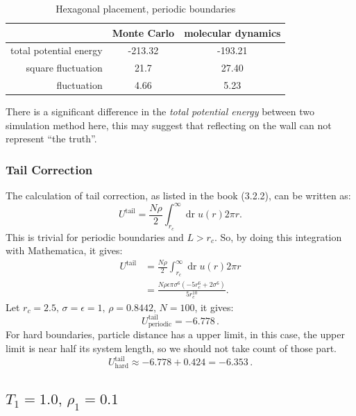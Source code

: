 \documentclass[UTF8,a4paper,no-math]{article}
\begin{document}
\begin{table}[H]
	\centering
	\caption{Hexagonal placement, periodic boundaries}
	\begin{tabular}{rcc}
		\toprule
		\toprule
		                       & Monte Carlo & molecular dynamics \\ \midrule
		total potential energy & -213.32     & -193.21            \\
		square fluctuation     & 21.7        & 27.40              \\
		fluctuation            & 4.66        & 5.23               \\
		\bottomrule
	\end{tabular}%
	\label{tab:hex2}%
\end{table}%
There is a significant difference in the \textit{total potential energy} between two simulation method here, this may suggest that reflecting on the wall can not represent ``the truth''.

\subsubsection{Tail Correction}
The calculation of tail correction, as listed in the book (3.2.2), can be written as:
\begin{equation}
	U^{\text{tail}} = \frac{N \rho}{2} \int_{r_{c}}^{\infty} \operatorname{dr} u(r) 2 \pi r.
\end{equation}
This is trivial for periodic boundaries and $L>r_c$. So, by doing this integration with Mathematica, it gives:
\begin{equation}
	\begin{aligned}
		U^{\text{tail}} &= \frac{N \rho}{2} \int_{r_{c}}^{\infty} \operatorname{dr} u(r) 2 \pi r \\
						&= \frac{N \rho \epsilon \pi \sigma^6\left(-5 r_c^6 + 2 \sigma^6\right)}{5 r_c^{10}}.
	\end{aligned}
\end{equation}
Let $r_c = 2.5, \, \sigma = \epsilon = 1, \,\rho = 0.8442, \,N = 100$, it gives:
\begin{equation*}
	U^{\text{tail}}_{\text{periodic}} = -6.778\,.
\end{equation*}
For hard boundaries, particle distance has a upper limit, in this case, the upper limit is near half its system length, so we should not take count of those part.
\begin{equation*}
	U^{\text{tail}}_{\text{hard}} \approx -6.778 + 0.424 = -6.353 \,.
\end{equation*}

\subsection{$T_1 =1.0,\, \rho_1 = 0.1$}
\end{document}
